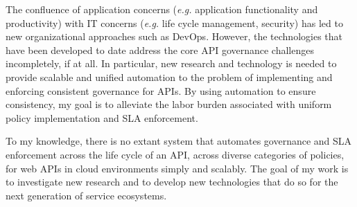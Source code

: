 The confluence of application concerns ({\em e.g.} 
application functionality and productivity) with IT 
concerns ({\em e.g.} life cycle management, security) 
has led to new organizational approaches such as
DevOps.  However, 
the technologies that have been developed
to date address the core API
governance challenges incompletely, if at all. 
In particular, new research and technology is needed 
to provide scalable and unified automation to the problem
of implementing and enforcing consistent governance for APIs. 
By using automation to ensure consistency, my goal is to alleviate the 
labor burden associated with uniform policy implementation and SLA enforcement.  

To my knowledge, there is no extant system that automates governance and
SLA enforcement across the life cycle
of an API, across diverse categories of policies, for web
APIs in cloud environments simply and scalably.  The goal of my work is to investigate 
new research and to develop
new technologies that do so for the next generation of service ecosystems.